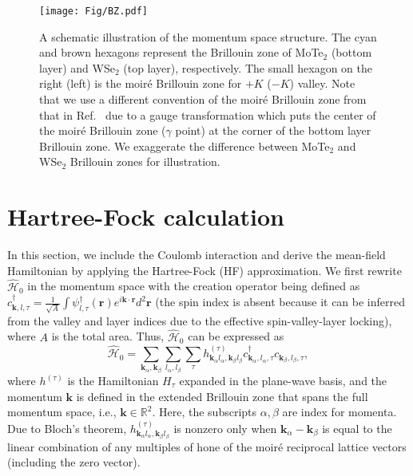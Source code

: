 \documentclass[aps,prl,onecolumn,superscriptaddress,longbibliography]{revtex4-2}
\begin{document}
\begin{figure}[ht]
    \centering
    \texttt{[image: Fig/BZ.pdf]}
    \caption{{A schematic illustration of the momentum space structure. The cyan and brown hexagons represent the  Brillouin zone of MoTe$_2$ (bottom layer) and WSe$_2$ (top layer), respectively. The small hexagon on the right (left) is the moir\'e Brillouin zone for $+K$ ($-K$) valley. Note that we use a different convention of the moir\'e Brillouin zone from that in Ref.~\cite{zhang2021spintextured} due to a gauge transformation which puts the center of the moir\'e Brillouin zone ($\gamma$ point) at the corner of the bottom layer Brillouin zone. We exaggerate the difference between MoTe$_2$ and WSe$_2$ Brillouin zones for illustration.}}
    \label{fig:BZ}
\end{figure}
\section{Hartree-Fock calculation}
In this section, we include the Coulomb interaction and derive the mean-field Hamiltonian by applying the Hartree-Fock (HF) approximation. We first rewrite $\hat{\mathcal{H}}_0$ in the momentum space with the creation operator being defined as $c_{\bm{k},l,\tau}^\dagger=\frac{1}{\sqrt{A}}\int \psi_{l,\tau}^\dagger(\bm{r}) e^{i \bm{k}\cdot \bm{r}} d^2 \bm{r}$ (the spin index is absent because it can be inferred from the valley and layer indices due to the effective spin-valley-layer locking), where $A$ is the total area. Thus, $\hat{\mathcal{H}}_0$ can be expressed as
\begin{equation}
    \hat{\mathcal{H}}_0=\sum_{\bm{k}_{\alpha},\bm{k}_{\beta}}\sum_{l_{\alpha},l_{\beta}}\sum_{\tau} h_{\bm{k}_{\alpha}l_{\alpha},\bm{k}_{\beta}l_{\beta}}^{(\tau)} c_{\bm{k}_{\alpha},l_{\alpha},\tau}^\dagger c_{\bm{k}_{\beta},l_{\beta},\tau},
\end{equation}
where $h^{(\tau)}$ is the Hamiltonian $H_{\tau}$ expanded in the plane-wave basis, and the momentum $\bm{k}$ is defined in the extended Brillouin zone {that spans the full momentum space, i.e., $\bm{k} \in \mathbb{R}^2$}. {Here, the subscripts $\alpha,\beta$ are index for momenta.} Due to Bloch's theorem, $h_{\bm{k}_{\alpha}l_{\alpha},\bm{k}_{\beta}l_{\beta}}^{(\tau)}$ is nonzero only when $\bm{k}_{\alpha}-\bm{k}_{\beta}$ is equal to {the linear combination of any multiples of hone of the moir\'e reciprocal lattice vectors (including the zero vector)}.
\end{document}
